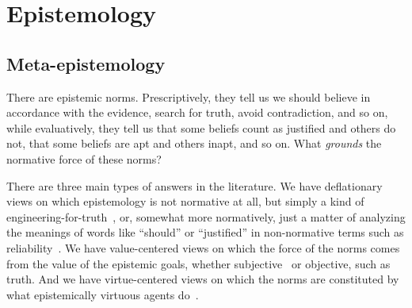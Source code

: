 \def\mychapter{V}

\chapter{Epistemology}\label{ch:epistemology}
\section{Meta-epistemology}
There are epistemic norms. Prescriptively, they tell us we should believe in accordance with the evidence, search 
for truth, avoid contradiction, and so on, while evaluatively, they tell us that some beliefs count as justified 
and others do not, that some beliefs are apt and others inapt, and so on. What \textit{grounds} the normative force
of these norms? 

There are three main types of answers in the literature. We have deflationary views on which epistemology
is not normative at all, but simply a kind of engineering-for-truth~\parencite[664--665]{Quine1986}, or,
somewhat more normatively, just a matter of analyzing the meanings of words like ``should'' or ``justified'' 
in non-normative terms such as reliability~\parencite{Goldman1986}. We have value-centered views on which
the force of the norms comes from the value of the epistemic goals, whether subjective~ or
objective, such as truth.
And we have virtue-centered views on which the norms are constituted by what epistemically virtuous agents
do~. 

